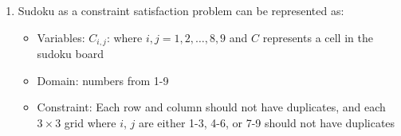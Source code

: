 \documentclass[12pt]{article}
\begin{document}
\section{}
\begin{enumerate}[label={\large\textbf{\alph*)}}]
\item Sudoku as a constraint satisfaction problem can be represented as:
\begin{itemize}
\item Variables: $C_{i, j}$: where $i, j = 1, 2, \dots, 8, 9$ and $C$ represents a cell in the sudoku board
\item Domain: numbers from 1-9
\item Constraint: Each row and column should not have duplicates, and each $3 \times 3$ grid where $i$, $j$ are either 1-3, 4-6, or 7-9 should not have duplicates
\end{itemize}


\end{enumerate}
\end{document}
